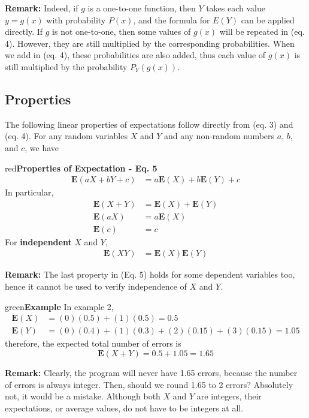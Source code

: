 \documentclass{article}
\newenvironment{example}[1]{\begin{mybox}{green}{\textbf{Example #1}}}{\end{mybox}}
\newenvironment{formula}[1]{\begin{mybox}{red}{\textbf{#1}}}{\end{mybox}}
\begin{document}
\textbf{Remark:} Indeed, if $g$ is a one-to-one function, then $Y$ takes each value $y = g(x)$ with probability $P(x)$, and the formula for $E(Y)$ can be applied directly. If $g$ is not one-to-one, then some values of $g(x)$ will be repeated in (eq. 4). However, they are still multiplied by the corresponding probabilities. When we add in (eq. 4), these probabilities are also added, thus each value of $g(x)$ is still multiplied by the probability $P_Y(g(x))$.

\subsection{Properties}

The following linear properties of expectations follow directly from (eq. 3) and (eq. 4). For any random variables $X$ and $Y$ and any non-random numbers $a$, $b$, and $c$, we have
\begin{formula}{Properties of Expectation - Eq. 5}
\begin{align*}
    \mathbf{E}(aX + bY + c) &= a\mathbf{E}(X) + b\mathbf{E}(Y) + c
\end{align*}
In particular,
\begin{align*}
    \mathbf{E}(X + Y) &= \mathbf{E}(X) + \mathbf{E}(Y)\\
    \mathbf{E}(aX) &= a\mathbf{E}(X)\\
    \mathbf{E}(c) &= c
\end{align*}
For \textbf{independent} $X$ and $Y$,
\begin{align*}
    \mathbf{E}(XY) &= \mathbf{E}(X)\mathbf{E}(Y)
\end{align*}
\end{formula}

\textbf{Remark:} The last property in (Eq. 5) holds for some dependent variables too, hence it cannot be used to verify independence of $X$ and $Y$.

\begin{example}{}
In example 2,
\begin{align*}
    \mathbf{E}(X) &= (0)(0.5) + (1)(0.5) = 0.5\\
    \mathbf{E}(Y) &= (0)(0.4) + (1)(0.3) + (2)(0.15) + (3)(0.15) = 1.05
\end{align*}
therefore, the expected total number of errors is
\begin{equation*}
    \mathbf{E}(X + Y ) = 0.5 + 1.05 = 1.65
\end{equation*}
\end{example}
\textbf{Remark:} Clearly, the program will never have 1.65 errors, because the number of errors is always integer. Then, should we round 1.65 to 2 errors? Absolutely not, it would be a mistake. Although both $X$ and $Y$ are integers, their expectations, or average values, do not have to be integers at all.
\end{document}
